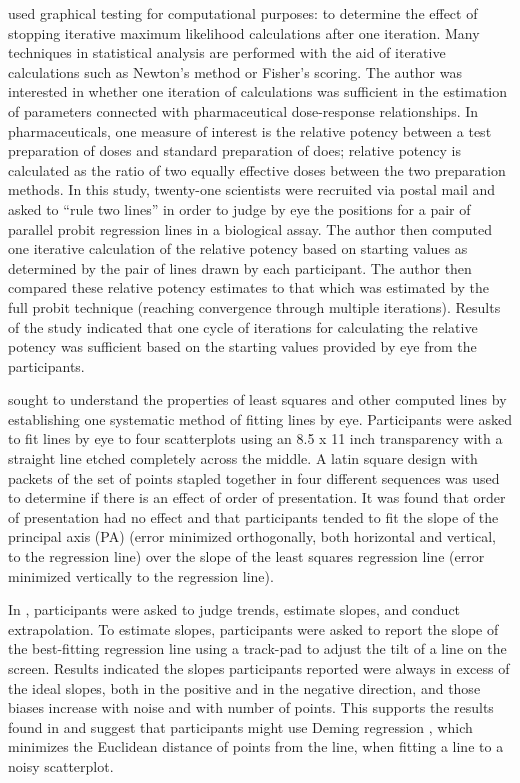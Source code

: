 \documentclass[12pt]{article}
\begin{document}
\citet{finney1951subjective} used graphical testing for computational
purposes: to determine the effect of stopping iterative maximum
likelihood calculations after one iteration. Many techniques in
statistical analysis are performed with the aid of iterative
calculations such as Newton's method or Fisher's scoring. The author was
interested in whether one iteration of calculations was sufficient in
the estimation of parameters connected with pharmaceutical dose-response
relationships. In pharmaceuticals, one measure of interest is the
relative potency between a test preparation of doses and standard
preparation of does; relative potency is calculated as the ratio of two
equally effective doses between the two preparation methods. In this
study, twenty-one scientists were recruited via postal mail and asked to
``rule two lines'' in order to judge by eye the positions for a pair of
parallel probit regression lines in a biological assay. The author then
computed one iterative calculation of the relative potency based on
starting values as determined by the pair of lines drawn by each
participant. The author then compared these relative potency estimates
to that which was estimated by the full probit technique (reaching
convergence through multiple iterations). Results of the study indicated
that one cycle of iterations for calculating the relative potency was
sufficient based on the starting values provided by eye from the
participants.

\citet{mosteller1981eye} sought to understand the properties of least
squares and other computed lines by establishing one systematic method
of fitting lines by eye. Participants were asked to fit lines by eye to
four scatterplots using an 8.5 x 11 inch transparency with a straight
line etched completely across the middle. A latin square design with
packets of the set of points stapled together in four different
sequences was used to determine if there is an effect of order of
presentation. It was found that order of presentation had no effect and
that participants tended to fit the slope of the principal axis (PA)
(error minimized orthogonally, both horizontal and vertical, to the
regression line) over the slope of the least squares regression line
(error minimized vertically to the regression line).

In \citet{ciccione2021can}, participants were asked to judge trends,
estimate slopes, and conduct extrapolation. To estimate slopes,
participants were asked to report the slope of the best-fitting
regression line using a track-pad to adjust the tilt of a line on the
screen. Results indicated the slopes participants reported were always
in excess of the ideal slopes, both in the positive and in the negative
direction, and those biases increase with noise and with number of
points. This supports the results found in \citet{mosteller1981eye} and
suggest that participants might use Deming regression
\citep{deming1943statistical, linnet1998performance, martin2000general},
which minimizes the Euclidean distance of points from the line, when
fitting a line to a noisy scatterplot.
\end{document}
